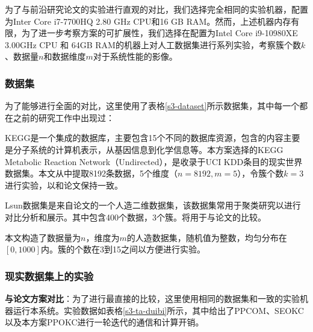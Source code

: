 为了与前沿研究论文\cite{wu2020secure,mohassel2019practical}的实验进行直观的对比，我们选择完全相同的实验机器，配置为Inter Core i7-7700HQ 2.80 GHz CPU和16 GB RAM。然而，上述机器内存有限，为了进一步考察方案的可扩展性，我们选择在配置为Intel Core i9-10980XE 3.00GHz CPU 和 64GB RAM的机器上对人工数据集进行系列实验，考察簇个数$k$、数据量$n$和数据维度$m$对于系统性能的影像。
\subsubsection{数据集}
为了能够进行全面的对比，这里使用了表格\ref{s3-dataset}所示数据集，其中每一个都在之前的研究工作中出现过：
\begin{compactitem}
	\item KEGG是一个集成的数据库，主要包含15个不同的数据库资源，包含的内容主要是分子系统的计算机表示，从基因信息到化学信息等。本方案选择的KEGG Metabolic Reaction Network（Undirected），是收录于UCI KDD条目的现实世界数据集\cite{naeem2011kegg}。本文从中提取8192条数据，5个维度（$ n=8192,m=5 $），令簇个数$ k=3 $进行实验，以和论文\cite{wu2020secure}保持一致。
	\item Lsun数据集是来自论文\cite{franti2018k}的一个人造二维数据集，该数据集常用于聚类研究以进行对比分析和展示。其中包含400个数据，3个簇。将用于与论文\cite{jaschke2019unsupervised}的比较。
	\item 本文构造了数据量为$ n $，维度为$ m $的人造数据集，随机值为整数，均匀分布在$ [0,1000] $内。簇的个数在3到15之间以方便进行实验。
\end{compactitem}
\begin{table}[htbp]
	\centering
	\renewcommand{\arraystretch}{1.3}
	\caption{数据集详细信息}
	\label{s3-dataset}
\end{table}
\subsubsection{现实数据集上的实验}
\textbf{与论文\cite{wu2020secure}方案对比}：为了进行最直接的比较，这里使用相同的数据集和一致的实验机器运行本系统。实验数据如表格\ref{s3-ta-duibi}所示，其中给出了PPCOM\cite{rong2017privacy}、SEOKC\cite{wu2020secure}以及本方案PPOKC进行一轮迭代的通信和计算开销。

